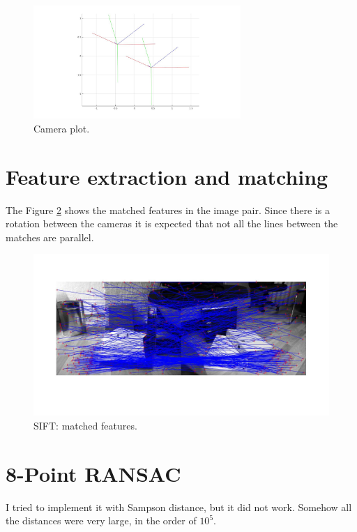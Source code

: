 \documentclass[paper=a4, fontsize=11pt]{scrartcl} %
\numberwithin{equation}{section} %
\numberwithin{figure}{section} %
\numberwithin{table}{section} %
\begin{document}
\begin{figure}[h!]
\centering
\includegraphics[width=0.7\textwidth]{cameras.jpg}
\caption{Camera plot.}
\label{fig:camera}
\end{figure}		

\section{Feature extraction and matching}		

The Figure \ref{fig:sift} shows the matched features in the image pair. Since there is a rotation between the cameras it is expected that not all the lines between the matches are parallel.

\begin{figure}[h!]
\centering
\includegraphics[width=1.2\textwidth]{sift.jpg}
\caption{SIFT: matched features.}
\label{fig:sift}
\end{figure}

\section{8-Point RANSAC}
I tried to implement it with Sampson distance, but it did not work. Somehow all the distances were very large, in the order of $10^5$.
\end{document}
